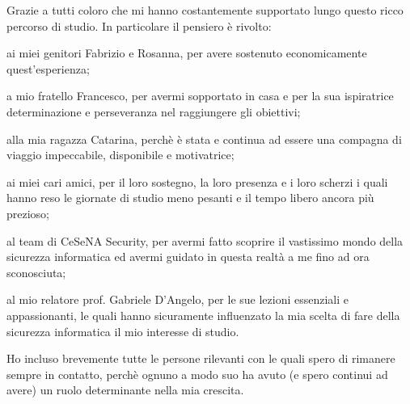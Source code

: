 \begin{acknowledgements}
\addchaptertocentry{\acknowledgementname} %

Grazie a tutti coloro che mi hanno costantemente supportato lungo questo ricco percorso di studio. In particolare il pensiero è rivolto:

ai miei genitori Fabrizio e Rosanna, per avere sostenuto economicamente quest'esperienza;

a mio fratello Francesco, per avermi sopportato in casa e per la sua ispiratrice determinazione e perseveranza nel raggiungere gli obiettivi;

alla mia ragazza Catarina, perchè è stata e continua ad essere una compagna di viaggio impeccabile, disponibile e motivatrice;

ai miei cari amici, per il loro sostegno, la loro presenza e i loro scherzi i quali hanno reso le giornate di studio meno pesanti e il tempo libero ancora più prezioso;

al team di CeSeNA Security, per avermi fatto scoprire il vastissimo mondo della sicurezza informatica ed avermi guidato in questa realtà a me fino ad ora sconosciuta;

al mio relatore prof. Gabriele D'Angelo, per le sue lezioni essenziali e appassionanti, le quali hanno sicuramente influenzato la mia scelta di fare della sicurezza informatica il mio interesse di studio.
\\\par
Ho incluso brevemente tutte le persone rilevanti con le quali spero di rimanere sempre in contatto, perchè ognuno a modo suo ha avuto (e spero continui ad avere) un ruolo determinante nella mia crescita.

\end{acknowledgements}
